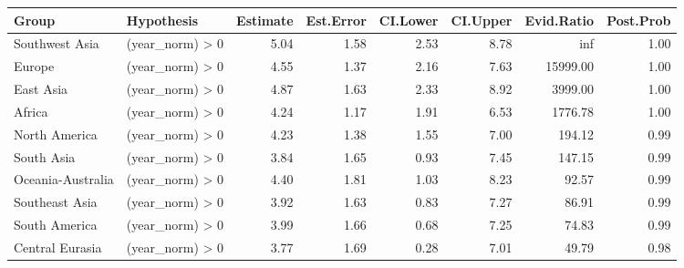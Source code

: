 \begin{tabular}{llrrrrrr}
\toprule
Group & Hypothesis & Estimate & Est.Error & CI.Lower & CI.Upper & Evid.Ratio & Post.Prob \\
\midrule
Southwest Asia & (year_norm) > 0 & 5.04 & 1.58 & 2.53 & 8.78 & inf & 1.00 \\
Europe & (year_norm) > 0 & 4.55 & 1.37 & 2.16 & 7.63 & 15999.00 & 1.00 \\
East Asia & (year_norm) > 0 & 4.87 & 1.63 & 2.33 & 8.92 & 3999.00 & 1.00 \\
Africa & (year_norm) > 0 & 4.24 & 1.17 & 1.91 & 6.53 & 1776.78 & 1.00 \\
North America & (year_norm) > 0 & 4.23 & 1.38 & 1.55 & 7.00 & 194.12 & 0.99 \\
South Asia & (year_norm) > 0 & 3.84 & 1.65 & 0.93 & 7.45 & 147.15 & 0.99 \\
Oceania-Australia & (year_norm) > 0 & 4.40 & 1.81 & 1.03 & 8.23 & 92.57 & 0.99 \\
Southeast Asia & (year_norm) > 0 & 3.92 & 1.63 & 0.83 & 7.27 & 86.91 & 0.99 \\
South America & (year_norm) > 0 & 3.99 & 1.66 & 0.68 & 7.25 & 74.83 & 0.99 \\
Central Eurasia & (year_norm) > 0 & 3.77 & 1.69 & 0.28 & 7.01 & 49.79 & 0.98 \\
\bottomrule
\end{tabular}
